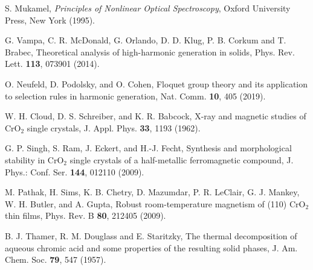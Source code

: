 \documentclass[checkin,showpacs,psfig,aps,pra]{revtex4}
\begin{document}
\begin{thebibliography}{99}
S. Mukamel, {\it Principles of Nonlinear Optical
Spectroscopy}, Oxford University Press, New York (1995).

G. Vampa, C. R. McDonald, G. Orlando, D. D. Klug,
P. B. Corkum and T. Brabec, {Theoretical analysis of high-harmonic
generation in solids}, Phys. Rev. Lett. {\bf 113}, 073901 (2014).

O. Neufeld, D. Podolsky, and O. Cohen, {Floquet
group theory and its application to selection rules in harmonic
generation}, Nat. Comm. {\bf 10}, 405 (2019).

W. H. Cloud, D. S. Schreiber, and K. R. Babcock,
{X-ray and magnetic studies of CrO$_2$ single crystals},
J. Appl. Phys. {\bf 33}, 1193 (1962).

G. P. Singh, S. Ram, J. Eckert, and H.-J. Fecht,
{Synthesis and morphological stability in CrO$_2$ single crystals of a
half-metallic ferromagnetic compound}, J. Phys.: Conf. Ser. {\bf
144}, 012110 (2009).

M. Pathak, H. Sims, K.  B. Chetry, D. Mazumdar,
P. R. LeClair, G.  J. Mankey, W. H. Butler, and A. Gupta,
{Robust room-temperature magnetism of (110) CrO$_2$ thin films},
Phys. Rev. B {\bf 80}, 212405 (2009).

 B. J. Thamer, R. M. Douglass and E. Staritzky,
{The thermal decomposition of aqueous chromic acid and some
properties of the resulting solid phases}, J. Am. Chem. Soc. {\bf
79}, 547 (1957).

\end{thebibliography}

\clearpage
\end{document}
